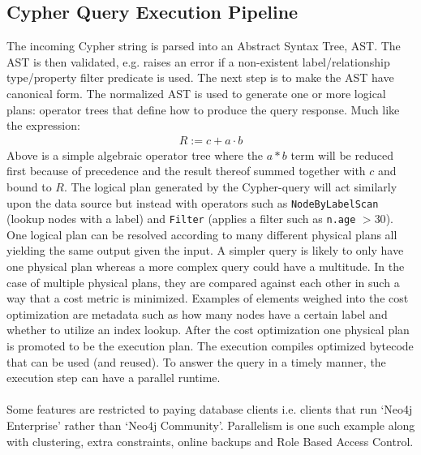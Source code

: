 \documentclass[ oneside,openright,titlepage,numbers=noenddot,headinclude,%
                footinclude=true,cleardoublepage=empty,abstractoff, %
                BCOR=0mm,paper=a4,fontsize=11pt,%
                ngerman,american,%
                ]{scrreprt}
\begin{document}
\subsection{Cypher Query Execution Pipeline}

The incoming Cypher string is parsed into an Abstract Syntax Tree, AST. The AST is then validated, e.g. raises an error if a non-existent label/relationship type/property filter predicate is used. The next step is to make the AST have canonical form. 
The normalized AST is used to generate one or more logical plans: operator trees that define how to produce the query response. Much like the expression:
\begin{align*}
    R := c + a \cdot b
\end{align*}
Above is a simple algebraic operator tree where the $a*b$ term will be reduced first because of precedence and the result thereof summed together with $c$ and bound to $R$. The logical plan generated by the Cypher-query will act similarly upon the data source but instead with operators such as \texttt{NodeByLabelScan} (lookup nodes with a label) and \texttt{Filter} (applies a filter such as \texttt{n.age} $> 30$). One logical plan can be resolved according to many different physical plans all yielding the same output given the input. A simpler query is likely to only have one physical plan whereas a more complex query could have a multitude. In the case of multiple physical plans, they are compared against each other in such a way that a cost metric is minimized. Examples of elements weighed into the cost optimization are metadata such as how many nodes have a certain label and whether to utilize an index lookup.
After the cost optimization one physical plan is promoted to be the execution plan. 
The execution compiles optimized bytecode that can be used (and reused).
To answer the query in a timely manner, the execution step can have a parallel runtime. 
\\\\
Some features are restricted to paying database clients i.e. clients that run `Neo4j Enterprise' rather than `Neo4j Community'. Parallelism is one such example along with clustering, extra constraints, online backups and Role Based Access Control.
\end{document}
